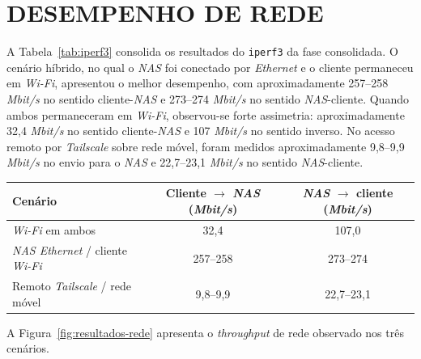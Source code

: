 \section{DESEMPENHO DE REDE}

A Tabela~\ref{tab:iperf3} consolida os resultados do \texttt{iperf3} da fase consolidada. O cenário híbrido, no qual o \textit{NAS} foi conectado por \textit{Ethernet} e o cliente permaneceu em \textit{Wi-Fi}, apresentou o melhor desempenho, com aproximadamente 257--258 \textit{Mbit/s} no sentido cliente-\textit{NAS} e 273--274 \textit{Mbit/s} no sentido \textit{NAS}-cliente. Quando ambos permaneceram em \textit{Wi-Fi}, observou-se forte assimetria: aproximadamente 32,4 \textit{Mbit/s} no sentido cliente-\textit{NAS} e 107 \textit{Mbit/s} no sentido inverso. No acesso remoto por \textit{Tailscale} sobre rede móvel, foram medidos aproximadamente 9,8--9,9 \textit{Mbit/s} no envio para o \textit{NAS} e 22,7--23,1 \textit{Mbit/s} no sentido \textit{NAS}-cliente.

\begin{table}[H]
    \centering
    \small
    \renewcommand{\arraystretch}{1.15}
    \begin{tabularx}{\linewidth}{|>{\raggedright\arraybackslash}X|c|c|}
        \hline
        \textbf{Cenário} & \textbf{Cliente $\rightarrow$ \textit{NAS} (\textit{Mbit/s})} & \textbf{\textit{NAS} $\rightarrow$ cliente (\textit{Mbit/s})} \\
        \hline
        \hline
        \textit{Wi-Fi} em ambos & 32,4 & 107,0 \\
        \hline
        \textit{NAS Ethernet} / cliente \textit{Wi-Fi} & 257--258 & 273--274 \\
        \hline
        Remoto \textit{Tailscale} / rede móvel & 9,8--9,9 & 22,7--23,1 \\
        \hline
    \end{tabularx}
    \vspace{0.2cm}
    \fonteautoria
\end{table}

A Figura~\ref{fig:resultados-rede} apresenta o \textit{throughput} de rede observado nos três cenários.

\begin{figure}[H]
    \centering
    \fonteautoria
\end{figure}

